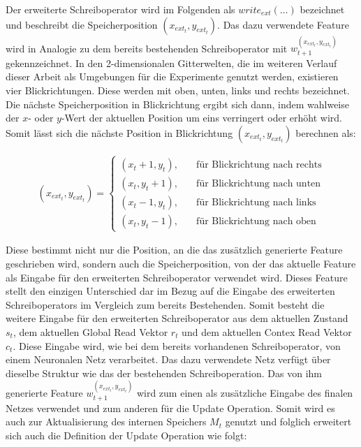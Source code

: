 Der erweiterte Schreiboperator wird im Folgenden als $write_{ext}(\dots)$ bezeichnet und beschreibt die Speicherposition $(x_{ext_t},y_{ext_t})$. Das dazu verwendete Feature wird in Analogie zu dem bereits bestehenden Schreiboperator mit $w_{t+1}^{(x_{ext_t},y_{ext_t})}$ gekennzeichnet. In den 2-dimensionalen Gitterwelten, die im weiteren Verlauf dieser Arbeit als Umgebungen für die Experimente genutzt werden, existieren vier Blickrichtungen. Diese werden mit oben, unten, links und rechts bezeichnet. Die nächste Speicherposition in Blickrichtung ergibt sich dann, indem wahlweise der $x$- oder $y$-Wert der aktuellen Position um eins verringert oder erhöht wird. Somit lässt sich die nächste Position in Blickrichtung $(x_{ext_t},y_{ext_t})$ berechnen als:

\begin{equation}
\begin{aligned}
(x_{ext_t}, y_{ext_t}) =
\begin{cases}
(x_t + 1,y_t), & \quad \text{für Blickrichtung nach rechts} \\
(x_t,y_t + 1), & \quad \text{für Blickrichtung nach unten} \\
(x_t - 1,y_t), & \quad \text{für Blickrichtung nach links} \\
(x_t,y_t - 1), & \quad \text{für Blickrichtung nach oben}
\end{cases}
\end{aligned}
\end{equation}

Diese bestimmt nicht nur die Position, an die das zusätzlich generierte Feature geschrieben wird, sondern auch die Speicherposition, von der das aktuelle Feature als Eingabe für den erweiterten Schreiboperator verwendet wird. Dieses Feature stellt den einzigen Unterschied dar im Bezug auf die Eingabe des erweiterten Schreiboperators im Vergleich zum bereits Bestehenden. Somit besteht die weitere Eingabe für den erweiterten Schreiboperator aus dem aktuellen Zustand $s_t$, dem aktuellen Global Read Vektor $r_t$ und dem aktuellen Contex Read Vektor $c_t$.
Diese Eingabe wird, wie bei dem bereits vorhandenen Schreiboperator, von einem Neuronalen Netz verarbeitet. Das dazu verwendete Netz verfügt über dieselbe Struktur wie das der bestehenden Schreiboperation. Das von ihm generierte Feature $w_{t+1}^{(x_{ext_t},y_{ext_t})}$ wird zum einen als zusätzliche Eingabe des finalen Netzes verwendet und zum anderen für die Update Operation. Somit wird es auch zur Aktualisierung des internen Speichers $M_t$ genutzt und folglich erweitert sich auch die Definition der Update Operation wie folgt:

